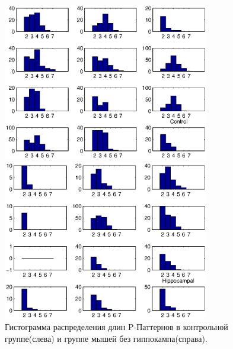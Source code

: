\documentclass[12pt]{report}
\begin{document}
\begin{figure}[H]
	\begin{multicols}{2}
	\hfill
	\includegraphics[width=90mm]{hPC.eps}

	\includegraphics[width=90mm]{hPH.eps}
	\end{multicols}
	\caption{Гистограмма распределения длин P-Паттернов в контрольной группе(слева) и группе мышей без гиппокампа(справа).}
\end{figure}
\end{document}
